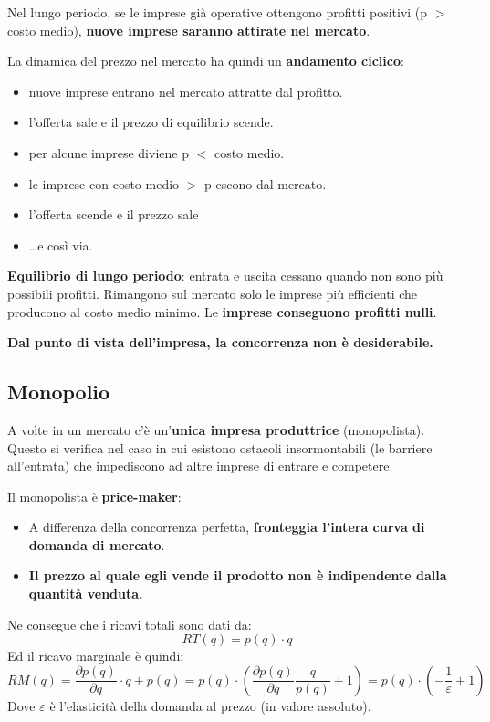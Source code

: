 \documentclass[../main.tex]{subfiles}
\begin{document}
Nel lungo periodo, se le imprese già operative ottengono profitti positivi (p $>$ costo medio), \textbf{nuove imprese saranno attirate nel mercato}.

La dinamica del prezzo nel mercato ha quindi un \textbf{andamento ciclico}:

\begin{itemize}
    \item nuove imprese entrano nel mercato attratte dal profitto.
    \item l'offerta sale e il prezzo di equilibrio scende.
    \item per alcune imprese diviene p $<$ costo medio.
    \item le imprese con costo medio $>$ p escono dal mercato.
    \item l'offerta scende e il prezzo sale
    \item \dots e così via.
\end{itemize}

\textbf{Equilibrio di lungo periodo}: entrata e uscita cessano quando non sono più possibili profitti. Rimangono sul mercato solo le imprese più efficienti che producono al costo medio minimo. Le \textbf{imprese conseguono profitti nulli}.

\textbf{Dal punto di vista dell'impresa, la concorrenza non è desiderabile.}

\subsection{Monopolio}

A volte in un mercato c'è un'\textbf{unica impresa produttrice} (monopolista).
Questo si verifica nel caso in cui esistono ostacoli insormontabili (le barriere all'entrata) che impediscono ad altre imprese di entrare e competere.

Il monopolista è \textbf{price-maker}:
\begin{itemize}
    \item A differenza della concorrenza perfetta, \textbf{fronteggia l'intera curva di domanda di mercato}.
    \item \textbf{Il prezzo al quale egli vende il prodotto non è indipendente dalla quantità venduta.}
\end{itemize}

Ne consegue che i ricavi totali sono dati da:
$$RT(q) = p(q)\cdot q$$
Ed il ricavo marginale è quindi:
$$
    RM(q)=\frac{\partial p(q)}{\partial q}\cdot q + p(q) = p(q)\cdot \left(\frac{\partial p(q)}{\partial q}\frac{q}{p(q)}+1\right)=p(q)\cdot \left(-\frac{1}{\varepsilon}+1\right)
$$
Dove $\varepsilon$ è l'elasticità della domanda al prezzo (in valore assoluto).
\end{document}
